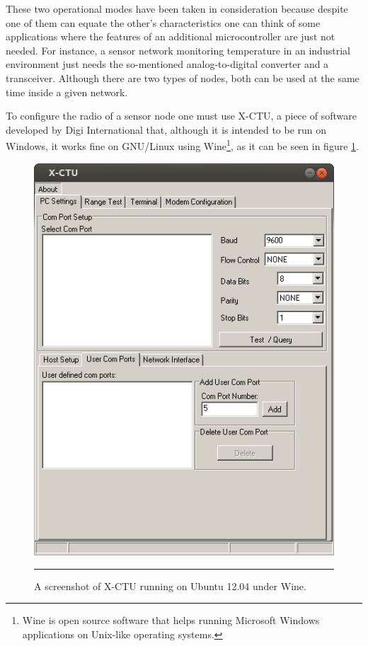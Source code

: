 These two operational modes have been taken in consideration because despite one of them can equate the other's characteristics one can think of some applications where the features of an additional microcontroller are just not needed. For instance, a sensor network monitoring temperature in an industrial environment just needs the so-mentioned analog-to-digital converter and a transceiver. Although there are two types of nodes, both can be used at the same time inside a given network.

To configure the radio of a sensor node one must use X-CTU, a piece of software developed by Digi International that, although it is intended to be run on Windows, it works fine on GNU/Linux using Wine\footnote{Wine is open source software that helps running Microsoft Windows applications on Unix-like operating systems.}, as it can be seen in figure \ref{fig:xctuonubuntu}.

\begin{figure}[htbp]
    \centering
        \includegraphics[scale=0.6]{./Figures/xctuonubuntu.png}
        \rule{35em}{0.5pt}
        \caption[Screenshot of X-CTU]{A screenshot of X-CTU running on Ubuntu 12.04 under Wine.}
    \label{fig:xctuonubuntu}
\end{figure}

